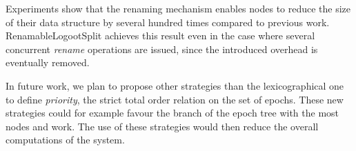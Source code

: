 \documentclass[10pt,journal,compsoc]{IEEEtran}
\begin{document}
Experiments show that the renaming mechanism enables nodes to reduce the size of their data structure by several hundred times compared to previous work.
RenamableLogootSplit achieves this result even in the case where several concurrent \emph{rename} operations are issued, since the introduced overhead is eventually removed.

In future work, we plan to propose other strategies than the lexicographical one to define \emph{priority}, the strict total order relation on the set of epochs.
These new strategies could for example favour the branch of the epoch tree with the most nodes and work.
The use of these strategies would then reduce the overall computations of the system.


%




\ifCLASSOPTIONcaptionsoff
  \newpage
\fi
\end{document}
